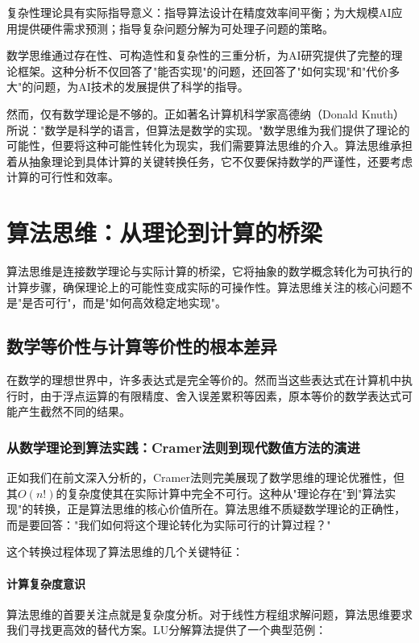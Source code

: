 复杂性理论具有实际指导意义：指导算法设计在精度效率间平衡；为大规模AI应用提供硬件需求预测；指导复杂问题分解为可处理子问题的策略。

数学思维通过存在性、可构造性和复杂性的三重分析，为AI研究提供了完整的理论框架。这种分析不仅回答了"能否实现"的问题，还回答了"如何实现"和"代价多大"的问题，为AI技术的发展提供了科学的指导。

然而，仅有数学理论是不够的。正如著名计算机科学家高德纳（Donald Knuth）所说："数学是科学的语言，但算法是数学的实现。"数学思维为我们提供了理论的可能性，但要将这种可能性转化为现实，我们需要算法思维的介入。算法思维承担着从抽象理论到具体计算的关键转换任务，它不仅要保持数学的严谨性，还要考虑计算的可行性和效率。

\section{算法思维：从理论到计算的桥梁}

算法思维是连接数学理论与实际计算的桥梁，它将抽象的数学概念转化为可执行的计算步骤，确保理论上的可能性变成实际的可操作性。算法思维关注的核心问题不是"是否可行"，而是"如何高效稳定地实现"。

\subsection{数学等价性与计算等价性的根本差异}

在数学的理想世界中，许多表达式是完全等价的。然而当这些表达式在计算机中执行时，由于浮点运算的有限精度、舍入误差累积等因素，原本等价的数学表达式可能产生截然不同的结果。

\subsubsection{从数学理论到算法实践：Cramer法则到现代数值方法的演进}

正如我们在前文深入分析的，Cramer法则完美展现了数学思维的理论优雅性，但其$O(n!)$的复杂度使其在实际计算中完全不可行。这种从"理论存在"到"算法实现"的转换，正是算法思维的核心价值所在。算法思维不质疑数学理论的正确性，而是要回答："我们如何将这个理论转化为实际可行的计算过程？"

这个转换过程体现了算法思维的几个关键特征：

\paragraph{计算复杂度意识}
算法思维的首要关注点就是复杂度分析。对于线性方程组求解问题，算法思维要求我们寻找更高效的替代方案。LU分解算法提供了一个典型范例：

